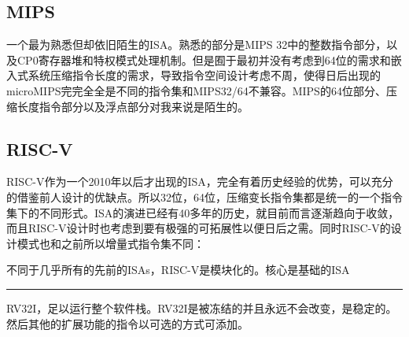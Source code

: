 \documentclass{article}
\newcommand{\chinesedash}{\rule[.7ex]{\widthof{二字}}{0.5pt}}
\begin{document}
\subsection{MIPS}
一个最为熟悉但却依旧陌生的ISA。熟悉的部分是MIPS 32中的整数指令部分，以及CP0寄存器堆和特权模式处理机制。但是囿于最初并没有考虑到64位的需求和嵌入式系统压缩指令长度的需求，导致指令空间设计考虑不周，使得日后出现的microMIPS完完全全是不同的指令集和MIPS32/64不兼容。MIPS的64位部分、压缩长度指令部分以及浮点部分对我来说是陌生的。
\subsection{RISC-V}
RISC-V作为一个2010年以后才出现的ISA，完全有着历史经验的优势，可以充分的借鉴前人设计的优缺点。所以32位，64位，压缩变长指令集都是统一的一个指令集下的不同形式。ISA的演进已经有40多年的历史，就目前而言逐渐趋向于收敛，而且RISC-V设计时也考虑到要有极强的可拓展性以便日后之需。同时RISC-V的设计模式也和之前所以增量式指令集不同：

不同于几乎所有的先前的ISAs，RISC-V是模块化的。核心是基础的ISA\chinesedash RV32I，足以运行整个软件栈。RV32I是被冻结的并且永远不会改变，是稳定的。然后其他的扩展功能的指令以可选的方式可添加。~\cite{reader}
\end{document}
